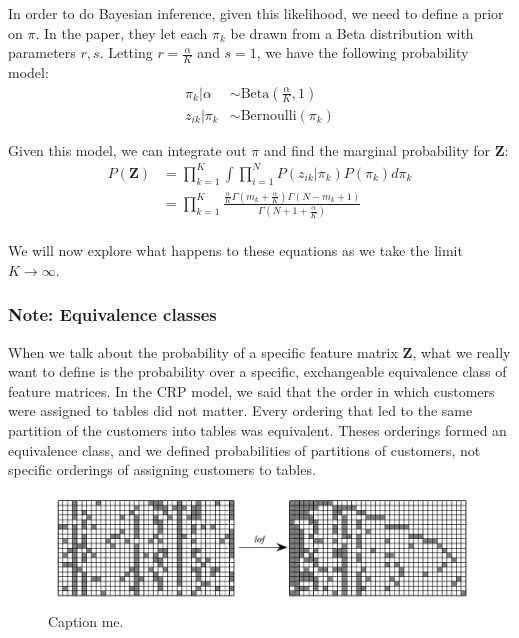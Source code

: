 \documentclass[twoside]{article}
\begin{document}
In order to do Bayesian inference, given this likelihood, we need to define a prior on $\pi$. In the paper, they let each $\pi_k$ be drawn from a Beta distribution with parameters $r, s$. Letting $r = \frac{\alpha}{K}$ and $s = 1$, we have the following probability model:
\begin{equation}
\begin{split}
    \pi_k | \alpha & \sim \text{Beta}(\frac{\alpha}{K}, 1) \\
    z_{ik} | \pi_k & \sim \text{Bernoulli}(\pi_k)
\end{split}
\end{equation}

Given this model, we can integrate out $\pi$ and find the marginal probability for $\mathbf{Z}$:
\begin{equation}
\begin{split}
    P(\mathbf{Z}) & = \prod_{k = 1}^K \int \prod_{i = 1}^N P(z_{ik} | \pi_k) P(\pi_k) d\pi_k \\
    &  = \prod_{k = 1}^K \frac{\frac{\alpha}{K} \Gamma(m_k + \frac{\alpha}{K}) \Gamma(N - m_k + 1)}{\Gamma(N + 1 + \frac{\alpha}{K})} \\
\end{split}
\label{eq:pz}
\end{equation}

We will now explore what happens to these equations as we take the limit $K \to \infty$.

\subsubsection*{Note: Equivalence classes}
When we talk about the probability of a specific feature matrix $\mathbf{Z}$, what we really want to define is the probability over a specific, exchangeable equivalence class of feature matrices. In the CRP model, we said that the order in which customers were assigned to tables did not matter. Every ordering that led to the same partition of the customers into tables was equivalent. Theses orderings formed an equivalence class, and we defined probabilities of partitions of customers, not specific orderings of assigning customers to tables. 

\begin{figure}[h]
  \centering
    \includegraphics[scale=0.35]{lof}
  \caption{Caption me.}
  \label{fig:lof}
\end{figure}
\end{document}
